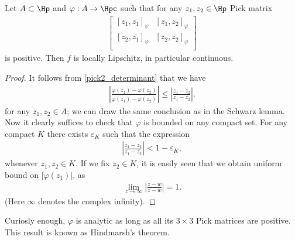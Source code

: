 \begin{lause}\label{pick_continuity_lemma}
	Let $A \subset \Hp$ and $\varphi : A \to \Hpc$ such that for any $z_{1}, z_{2} \in \Hp$ Pick matrix
	\begin{align*}
	\begin{bmatrix}
		[z_{1}, \overline{z_{1}}]_{\varphi} & [z_{1}, \overline{z_{2}}]_{\varphi}\\
		[z_{2}, \overline{z_{1}}]_{\varphi} & [z_{2}, \overline{z_{2}}]_{\varphi}\\
	\end{bmatrix}
	\end{align*}
	is positive. Then $f$ is locally Lipschitz, in particular continuous.
\end{lause}
\begin{proof}
	It follows from \ref{pick2_determinant} that we have
	\begin{align*}
		\left|\frac{\varphi(z_{1}) - \varphi(z_{2})}{\varphi(z_{1}) - \overline{\varphi(z_{2})}} \right| \leq \left|\frac{z_{1} - z_{2}}{z_{1} - \overline{z_{2}}} \right|.
	\end{align*}
	for any $z_{1}, z_{2} \in A$; we can draw the same conclusion as in the Schwarz lemma. Now it clearly suffices to check that $\varphi$ is bounded on any compact set. For any compact $K$ there exists $\varepsilon_{K}$ such that the expression
	\begin{align*}
		\left|\frac{z_{1} - z_{2}}{z_{1} - \overline{z_{2}}} \right| < 1 - \varepsilon_{K},
	\end{align*}
	whenever $z_{1}, z_{2} \in K$. If we fix $z_{2} \in K$, it is easily seen that we obtain uniform bound on $|\varphi(z_{1})|$, as
	\begin{align*}
		\lim_{z \to \infty}  \left|\frac{z - w}{z - \overline{w}} \right| = 1.
	\end{align*}
	(Here $\infty$ denotes the complex infinity).
\end{proof}

Curiosly enough, $\varphi$ is analytic as long as all its $3 \times 3$ Pick matrices are positive. This result is known as Hindmarsh's theorem.

